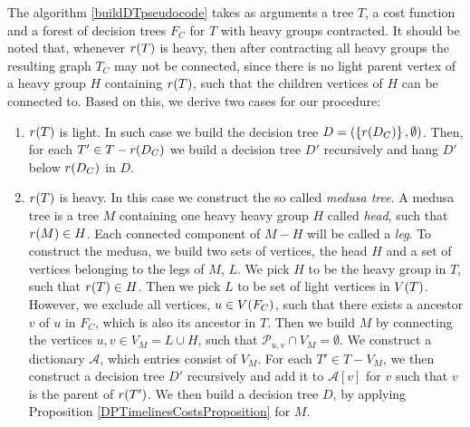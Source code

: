 


The algorithm \ref{buildDTpseudocode} takes as arguments a tree $T$, a cost function and a forest of decision trees $F_C$ for $T$ with heavy groups contracted. It should be noted that, whenever $r\mathopen{}\left( T \right)$ is heavy, then after contracting all heavy groups the resulting graph $T_C$ may not be connected, since there is no light parent vertex of a heavy group $H$ containing $r\mathopen{}\left( T \right)$, such that the children vertices of $H$ can be connected to. Based on this, we derive two cases for our procedure:
\begin{enumerate}
    \item $r\mathopen{}\left( T \right)$ is light. In such case we build the decision tree $D=\mathopen{}\left( \mathopen{}\left\{ r\mathopen{}\left( D_C \right) \right\}, \emptyset \right)$. Then, for each $T'\in T-r\mathopen{}\left( D_C \right)$ we build a decision tree $D'$ recursively and hang $D'$ below $r\mathopen{}\left( D_C \right)$ in $D$.
    \item $r\mathopen{}\left( T \right)$ is heavy. In this case we construct the so called \textit{medusa tree}. A medusa tree is a tree $M$ containing one heavy heavy group $H$ called \textit{head}, such that $r\mathopen{}\left( M \right)\in H$. Each connected component of $M-H$ will be called a \textit{leg}. To construct the medusa, we build two sets of vertices, the head $H$ and a set of vertices belonging to the legs of $M$, $L$. We pick $H$ to be the heavy group in $T$, such that $r\mathopen{}\left( T \right)\in H$. Then we pick $L$ to be set of light vertices in $V\mathopen{}\left( T \right)$. However, we exclude all vertices, $u \in V\mathopen{}\left( F_C \right)$, such that there exists a ancestor $v$ of $u$ in $F_C$, which is also its ancestor in $T$. Then we build $M$ by connecting the vertices $u,v \in V_M=L\cup H$, such that $\mathcal{P}_{u,v}\cap V_M=\emptyset$. We construct a dictionary $\mathcal{A}$, which entries consist of $V_M$. For each $T'\in T-V_M$, we then construct a decision tree $D'$ recursively and add it to $\mathcal{A}[v]$ for $v$ such that $v$ is the parent of $r\mathopen{}\left( T' \right)$. We then build a decision tree $D$, by applying Proposition \ref{DPTimelinesCostsProposition} for $M$.
\end{enumerate}

